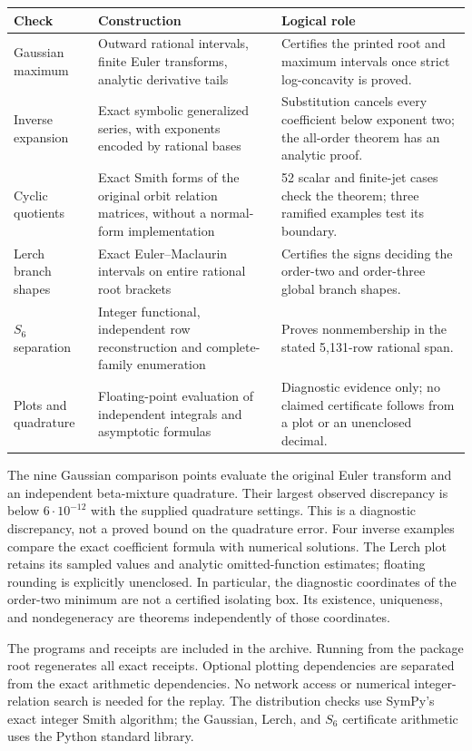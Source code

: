 \documentclass[11pt,a4paper]{article}
\numberwithin{equation}{section}
\theoremstyle{definition}
\theoremstyle{remark}
\begin{document}
\begin{longtable}{@{}L{0.24\textwidth}L{0.37\textwidth}L{0.32\textwidth}@{}}
\toprule
Check & Construction & Logical role\\
\midrule
\endhead
Gaussian maximum & Outward rational intervals, finite Euler transforms,
analytic derivative tails & Certifies the printed root and maximum
intervals once strict log-concavity is proved.\\[4pt]
Inverse expansion & Exact symbolic generalized series, with exponents
encoded by rational bases & Substitution cancels every coefficient below
exponent two; the all-order theorem has an analytic proof.\\[4pt]
Cyclic quotients & Exact Smith forms of the original orbit relation
matrices, without a normal-form implementation & 52 scalar and finite-jet
cases check the theorem; three ramified examples test its boundary.\\[4pt]
Lerch branch shapes & Exact Euler--Maclaurin intervals on entire rational
root brackets & Certifies the signs deciding the order-two and
order-three global branch shapes.\\[4pt]
$S_6$ separation & Integer functional, independent row reconstruction
and complete-family enumeration & Proves nonmembership in the stated
5,131-row rational span.\\[4pt]
Plots and quadrature & Floating-point evaluation of independent
integrals and asymptotic formulas & Diagnostic evidence only; no claimed
certificate follows from a plot or an unenclosed decimal.\\
\bottomrule
\end{longtable}

The nine Gaussian comparison points evaluate the original Euler
transform and an independent beta-mixture quadrature. Their largest
observed discrepancy is below $6\cdot10^{-12}$ with the supplied
quadrature settings. This is a diagnostic discrepancy, not a proved
bound on the quadrature error. Four inverse examples compare the exact
coefficient formula with numerical solutions. The Lerch plot retains
its sampled values and analytic omitted-function estimates; floating
rounding is explicitly unenclosed. In particular, the diagnostic
coordinates of the order-two minimum are not a certified isolating box.
Its existence, uniqueness, and nondegeneracy are theorems independently
of those coordinates.

The programs and receipts are included in the archive. Running
 from the package root regenerates all exact
receipts. Optional plotting dependencies are separated from the exact
arithmetic dependencies. No network access or numerical
integer-relation search is needed for the replay. The distribution
checks use SymPy's exact integer Smith algorithm; the Gaussian, Lerch,
and $S_6$ certificate arithmetic uses the Python standard library.
\end{document}
